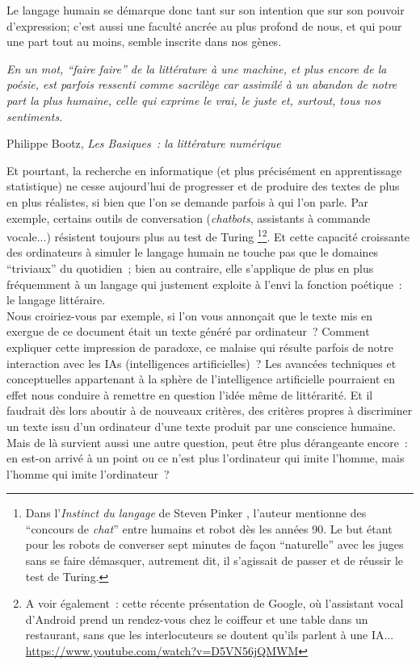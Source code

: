 \documentclass{article}
\newenvironment{citationbox}
{\begin{center}
		\begin{minipage}{.8\textwidth}
		}
		{
		\end{minipage}	
\end{center}
}
\begin{document}
		Le langage humain se démarque donc tant sur son intention que sur son pouvoir d'expression; c'est aussi une faculté ancrée au plus profond de nous, et qui pour une part tout au moins, semble inscrite dans nos gènes\cite{pinker2008}. 
		\begin{citationbox}
			\textit{En un mot, ``faire faire'' de la littérature à une machine, et plus encore de la poésie, est parfois ressenti comme sacrilège car assimilé à un abandon de notre part la plus humaine, celle qui exprime le vrai, le juste et, surtout, tous nos sentiments.}
			\begin{flushright}
				Philippe Bootz, \textit{Les Basiques~: la littérature numérique} \cite{bootz2006}
			\end{flushright}
		\end{citationbox}
		Et pourtant, la recherche en informatique (et plus précisément en apprentissage statistique) ne cesse aujourd'hui de progresser et de produire des textes de plus en plus réalistes, si bien que l'on se demande parfois à qui l'on parle. Par exemple, certains outils de conversation (\textit{chatbots}, assistants à commande vocale...) résistent toujours plus au test de Turing \cite{guilet2017}\footnote{Dans l'\textit{Instinct du langage} de Steven Pinker \cite{pinker2008}, l'auteur mentionne des ``concours de \textit{chat}'' entre humains et robot dès les années 90. Le but étant pour les robots de converser sept minutes de façon ``naturelle'' avec les juges sans se faire démasquer, autrement dit, il s'agissait de passer et de réussir le test de Turing.}\footnote{A voir également~: cette récente présentation de Google, où l'assistant vocal d'Android prend un rendez-vous chez le coiffeur et une table dans un restaurant, sans que les interlocuteurs se doutent qu'ils parlent à une IA... \href{https://www.youtube.com/watch?v=D5VN56jQMWM}{https://www.youtube.com/watch?v=D5VN56jQMWM}}. Et cette capacité croissante des ordinateurs à simuler le langage humain ne touche pas que le domaines ``triviaux'' du quotidien ; bien au contraire, elle s'applique de plus en plus fréquemment à un langage qui justement exploite à l'envi la fonction poétique~: le langage littéraire.\\
		
		Nous croiriez-vous par exemple, si l'on vous annonçait que le texte mis en exergue de ce document était un texte généré par ordinateur~? Comment expliquer cette impression de paradoxe, ce malaise qui résulte parfois de notre interaction avec les IAs (intelligences artificielles)~? Les avancées techniques et conceptuelles appartenant à la sphère de l'intelligence artificielle pourraient en effet nous conduire à remettre en question l'idée même de littérarité. Et il faudrait dès lors aboutir à de nouveaux critères, des critères propres à discriminer un texte issu d'un ordinateur d'une texte produit par une conscience humaine. Mais de là survient aussi une autre question, peut être plus dérangeante encore~: en est-on arrivé à un point ou ce n'est plus l'ordinateur qui imite l'homme, mais l'homme qui imite l'ordinateur~?\\
		
\end{document}
